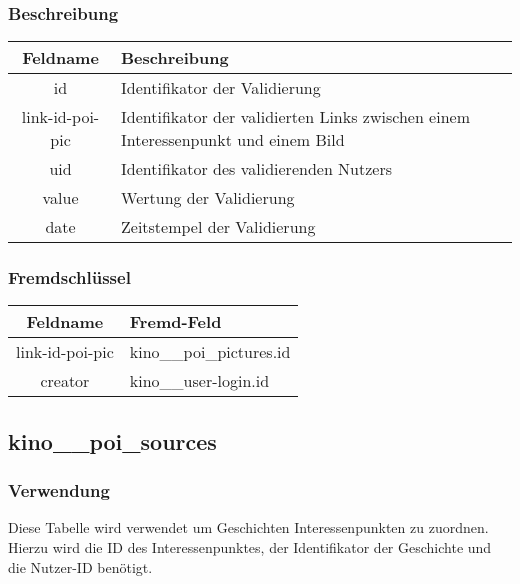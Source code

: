 \subsubsection{Beschreibung}
\begin{table}[H]
	\begin{tabular}{|c|p{12cm}|}
		\hline
		\textbf{Feldname} & \textbf{Beschreibung} \\ \hline
		id & Identifikator der Validierung \\ \hline
		link-id-poi-pic & Identifikator der validierten Links zwischen einem Interessenpunkt und einem Bild \\ \hline
		uid & Identifikator des validierenden Nutzers \\ \hline
		value & Wertung der Validierung \\ \hline
		date & Zeitstempel der Validierung \\ \hline
	\end{tabular}
\end{table}
\subsubsection{Fremdschlüssel}
\begin{table}[H]
	\begin{tabular}{|c|p{12.5cm}|}
		\hline
		\textbf{Feldname} & \textbf{Fremd-Feld} \\ \hline
		link-id-poi-pic & kino\_\_poi\_pictures.id \\ \hline
		creator & kino\_\_user-login.id \\ \hline
	\end{tabular}
\end{table}
\subsection{kino\_\_poi\_sources}
\subsubsection{Verwendung} Diese Tabelle wird verwendet um Geschichten Interessenpunkten zu zuordnen. Hierzu wird die ID des Interessenpunktes, der Identifikator der Geschichte und die Nutzer-ID benötigt.

